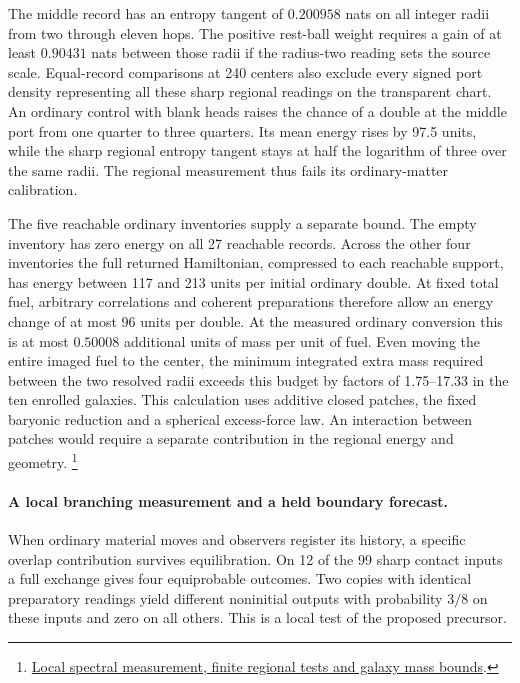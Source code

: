 \documentclass[11pt]{article}
\begin{document}
The middle record has an entropy tangent of $0.200958$ nats on all
integer radii from two through eleven hops. The positive rest-ball
weight requires a gain of at least $0.90431$ nats between those radii
if the radius-two reading sets the source scale. Equal-record
comparisons at 240 centers also exclude every signed port density
representing all these sharp regional readings on the transparent
chart. An ordinary control with blank heads raises the chance of a
double at the middle port from one quarter to three quarters. Its
mean energy rises by 97.5 units, while the sharp regional entropy
tangent stays at half the logarithm of three over the same radii.
The regional measurement thus fails its ordinary-matter calibration.

The five reachable ordinary inventories supply a separate bound.
The empty inventory has zero energy on all 27 reachable records.
Across the other four inventories the full returned Hamiltonian,
compressed to each reachable support, has energy between 117 and 213
units per initial ordinary double. At fixed total fuel, arbitrary
correlations and coherent preparations therefore allow an energy change
of at most 96 units per double. At the measured ordinary conversion this
is at most $0.50008$ additional units of mass per unit of fuel.
Even moving the entire imaged fuel to the center, the minimum integrated
extra mass required between the two resolved radii exceeds this budget
by factors of 1.75--17.33 in the ten enrolled galaxies. This calculation
uses additive closed patches, the fixed baryonic reduction and a
spherical excess-force law. An interaction between patches would require
a separate contribution in the regional energy and geometry.%
\footnote{\href{https://github.com/FloatingPragma/observer-patch-holography/blob/main/model/experiments/interval_echo_shell_flux/product_address/green_response/material_recoil/overlap_source/native_boundary/stock/aperture/NESTED_RESULTS.md}{Local spectral measurement, finite regional tests and galaxy mass bounds}.}

\paragraph{A local branching measurement and a held boundary forecast.}
When ordinary material moves and observers register its history, a
specific overlap contribution survives equilibration. On 12 of the
99 sharp contact inputs a full exchange gives four equiprobable
outcomes. Two copies with identical preparatory readings yield
different noninitial outputs with probability $3/8$ on these inputs
and zero on all others. This is a local test of the proposed precursor.
\end{document}

